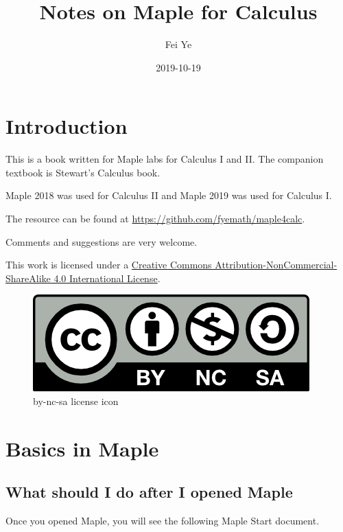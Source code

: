 \documentclass[]{book}
\title{Notes on Maple for Calculus}
\author{Fei Ye}
\date{2019-10-19}
\theoremstyle{definition}
\theoremstyle{definition}
\theoremstyle{definition}
\theoremstyle{remark}
\begin{document}
\maketitle

{
\setcounter{tocdepth}{1}
\tableofcontents
}
\hypertarget{introduction}{%
\chapter*{Introduction}\label{introduction}}

This is a book written for Maple labs for Calculus I and II. The companion textbook is Stewart's Calculus book.

Maple 2018 was used for Calculus II and Maple 2019 was used for Calculus I.

The resource can be found at \url{https://github.com/fyemath/maple4calc}.

Comments and suggestions are very welcome.

This work is licensed under a \href{https://creativecommons.org/licenses/by-nc-sa/4.0/}{Creative Commons Attribution-NonCommercial-ShareAlike 4.0 International License}.

\begin{figure}
\centering
\includegraphics{figs/by-nc-sa.png}
\caption{by-nc-sa license icon}
\end{figure}

\hypertarget{basics-in-maple}{%
\chapter{Basics in Maple}\label{basics-in-maple}}

\hypertarget{what-should-i-do-after-i-opened-maple}{%
\section{What should I do after I opened Maple}\label{what-should-i-do-after-i-opened-maple}}

Once you opened Maple, you will see the following Maple Start document.
\end{document}
